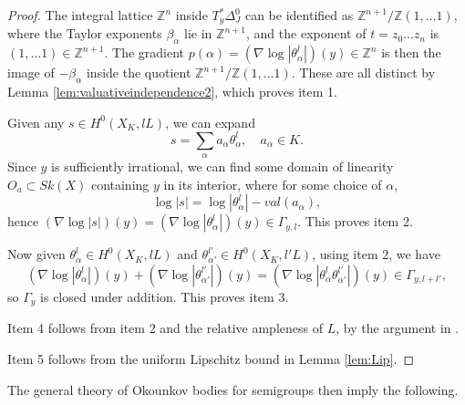 \documentclass[a4paper]{article}
\theoremstyle{definition}
\newcommand{\Z}{\mathbb{Z}}
\begin{document}
\begin{proof}
	The integral lattice $\Z^n$ inside $T_y^* \Delta_J^0$ can be identified as $\Z^{n+1}/\Z(1,\ldots 1)$, where the Taylor exponents $\beta_\alpha$  lie in $\Z^{n+1}$, and the exponent of $t=z_0\ldots z_n$ is $(1,\ldots 1)\in \Z^{n+1}$. The gradient $p(\alpha)=(\nabla \log |\theta_\alpha^l|)(y)\in \Z^n$  is then the image of $-\beta_\alpha$ inside the quotient $\Z^{n+1}/\Z(1,\ldots 1)$. These are all distinct by Lemma \ref{lem:valuativeindependence2}, which proves item 1.







Given any $s\in H^0(X_K, lL)$, we can expand
\[
s= \sum_\alpha a_\alpha \theta_\alpha^l,\quad a_\alpha\in K.
\]
Since $y$ is sufficiently irrational, we can find some domain of linearity $O_a\subset Sk(X)$ containing $y$ in its interior, where for some choice of $\alpha$,
\[
\log |s|= \log |\theta_\alpha^l |- val(a_\alpha),
\]
hence $(\nabla \log |s| )(y)= (\nabla \log |\theta_\alpha^l| )(y)\in \Gamma_{y,l}$. This proves item 2.






Now given $\theta_\alpha^l \in H^0(X_K, lL)$ and $\theta_{\alpha'}^{l'}\in H^0(X_K, l' L)$, 
using item 2, we have
\[
(\nabla \log |\theta_\alpha^l | )(y) +(\nabla \log |  \theta_{\alpha'}^{l'}   |) (y) =( \nabla \log |\theta_\alpha^l   \theta_{\alpha'}^{l'}| )(y) \in  \Gamma_{y,l+l'},
\]
so $\Gamma_y$ is closed under addition. This proves item 3. 





Item 4 follows from item 2 and the relative ampleness of $L$, by the argument in \cite[Prop. 3.3]{BoucksomOkounkov}.

Item 5 follows from the uniform Lipschitz bound in Lemma \ref{lem:Lip}.
\end{proof}





The general theory of Okounkov bodies for semigroups then imply the following.
\end{document}
